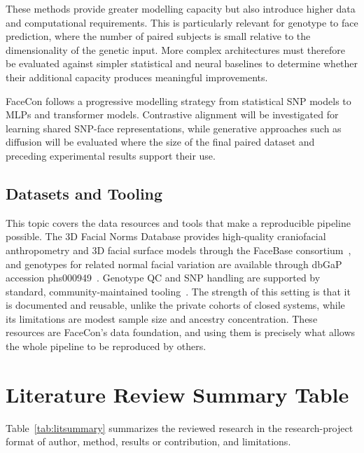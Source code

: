 These methods provide greater modelling capacity but also introduce higher data and computational requirements. This is particularly relevant for genotype to face prediction, where the number of paired subjects is small relative to the dimensionality of the genetic input. More complex architectures must therefore be evaluated against simpler statistical and neural baselines to determine whether their additional capacity produces meaningful improvements.

FaceCon follows a progressive modelling strategy from statistical SNP models to MLPs and transformer models. Contrastive alignment will be investigated for learning shared SNP-face representations, while generative approaches such as diffusion will be evaluated where the size of the final paired dataset and preceding experimental results support their use.

\subsection{Datasets and Tooling}
This topic covers the data resources and tools that make a reproducible pipeline possible. The 3D Facial Norms Database provides high-quality craniofacial anthropometry and 3D facial surface models through the FaceBase consortium~\cite{ref:facebase}, and genotypes for related normal facial variation are available through dbGaP accession phs000949~\cite{ref:dbgap}. Genotype QC and SNP handling are supported by standard, community-maintained tooling~\cite{ref:plink}. The strength of this setting is that it is documented and reusable, unlike the private cohorts of closed systems, while its limitations are modest sample size and ancestry concentration. These resources are FaceCon's data foundation, and using them is precisely what allows the whole pipeline to be reproduced by others.

\section{Literature Review Summary Table}
Table~\ref{tab:litsummary} summarizes the reviewed research in the research-project format of author, method, results or contribution, and limitations.

